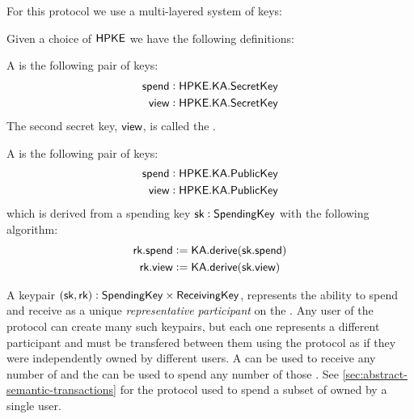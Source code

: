 
For this protocol we use a multi-layered system of keys:



Given a choice of ${\textsf{HPKE}}$ we have the following definitions:

\begin{definition}
    A \SpendingKey{} is the following pair of keys:
    \begin{align*}
        {\textsf{spend}} &: {\textsf{HPKE}}.{\textsf{KA}}.{\textsf{SecretKey}} \\
        {\textsf{view}}  &: {\textsf{HPKE}}.{\textsf{KA}}.{\textsf{SecretKey}}
    \end{align*}
    The second secret key, ${\textsf{view}}$, is called the \ViewingKey{}.
\end{definition}

\begin{definition}
    A \ReceivingKey{} is the following pair of keys:
    \begin{align*}
        {\textsf{spend}} &: {\textsf{HPKE}}.{\textsf{KA}}.{\textsf{PublicKey}} \\
        {\textsf{view}}  &: {\textsf{HPKE}}.{\textsf{KA}}.{\textsf{PublicKey}}
    \end{align*}
    which is derived from a spending key ${\textsf{sk}} : {\textsf{SpendingKey}}$ with the following algorithm:
    \begin{align*}
        {\textsf{rk}}.{\textsf{spend}} &:= {\textsf{KA}}.{\textsf{derive}}({\textsf{sk}}.{\textsf{spend}}) \\
        {\textsf{rk}}.{\textsf{view}}  &:= {\textsf{KA}}.{\textsf{derive}}({\textsf{sk}}.{\textsf{view}}) 
    \end{align*}
\end{definition}

A keypair $({\textsf{sk}}, {\textsf{rk}}) : {\textsf{SpendingKey}} \times {\textsf{ReceivingKey}}$, represents the ability to spend and receive  as a unique \emph{representative participant} on the \Ledger. Any user of the \MantaPay{} protocol can create many such keypairs, but each one represents a different participant and  must be transfered between them using the \Transfer{} protocol as if they were independently owned by different users. A \ReceivingKey{} can be used to receive any number of  and the \SpendingKey{} can be used to spend any number of those . See \autoref{sec:abstract-semantic-transactions} for the protocol used to spend a subset of  owned by a single user.

